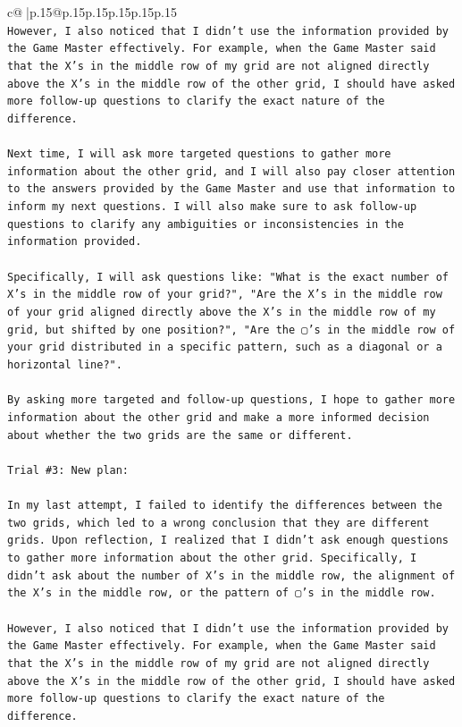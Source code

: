 \documentclass{article}
\begin{document}
{\begin{supertabular}{c@{$\;$}|p{.15\linewidth}@{}p{.15\linewidth}p{.15\linewidth}p{.15\linewidth}p{.15\linewidth}p{.15\linewidth}}
{{{\\ 
\texttt{However, I also noticed that I didn't use the information provided by the Game Master effectively. For example, when the Game Master said that the X's in the middle row of my grid are not aligned directly above the X's in the middle row of the other grid, I should have asked more follow{-}up questions to clarify the exact nature of the difference.} \\
\\ 
\texttt{Next time, I will ask more targeted questions to gather more information about the other grid, and I will also pay closer attention to the answers provided by the Game Master and use that information to inform my next questions. I will also make sure to ask follow{-}up questions to clarify any ambiguities or inconsistencies in the information provided.} \\
\\ 
\texttt{Specifically, I will ask questions like: "What is the exact number of X's in the middle row of your grid?", "Are the X's in the middle row of your grid aligned directly above the X's in the middle row of my grid, but shifted by one position?", "Are the ▢'s in the middle row of your grid distributed in a specific pattern, such as a diagonal or a horizontal line?".} \\
\\ 
\texttt{By asking more targeted and follow{-}up questions, I hope to gather more information about the other grid and make a more informed decision about whether the two grids are the same or different.} \\
\\ 
\texttt{Trial \#3: New plan: } \\
\\ 
\texttt{In my last attempt, I failed to identify the differences between the two grids, which led to a wrong conclusion that they are different grids. Upon reflection, I realized that I didn't ask enough questions to gather more information about the other grid. Specifically, I didn't ask about the number of X's in the middle row, the alignment of the X's in the middle row, or the pattern of ▢'s in the middle row.} \\
\\ 
\texttt{However, I also noticed that I didn't use the information provided by the Game Master effectively. For example, when the Game Master said that the X's in the middle row of my grid are not aligned directly above the X's in the middle row of the other grid, I should have asked more follow{-}up questions to clarify the exact nature of the difference.} \\
}}}
\end{supertabular}}
\end{document}
